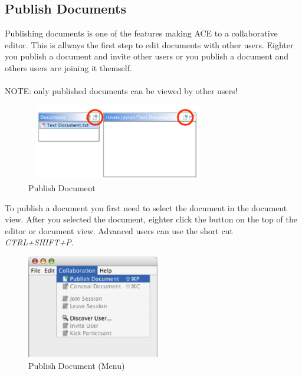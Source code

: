 \documentclass[11pt,a4paper]{article}
\begin{document}
\subsection{Publish Documents}
\label{publish_conceal_documents}
Publishing documents is one of the features making ACE to a collaborative editor. This is allways the first step to edit documents with other users. Eighter you publish a document and invite other users or you publish a document and others users are joining it themself. \\
\\
NOTE: only published documents can be viewed by other users!\\

\begin{figure}[H]
\begin{center}
  \includegraphics[height=1.32in, width=3.16in]{../images/usermanual/g_editor_view_publish.eps}
\caption{Publish Document}
\label{editor_view_publish}
\end{center}
\end{figure}

To publish a document you first need to select the document in the document view. After you selected the document, eighter click the button on the top of the editor or document view. Advanced users can use the short cut \textit{CTRL+SHIFT+P}.

\begin{figure}[H]
\begin{center}
  \includegraphics[height=1.78in, width=2.28in]{../images/usermanual/menu_collab_publish.eps}
\caption{Publish Document (Menu)}
\label{menu_publish}
\end{center}
\end{figure}
\end{document}
